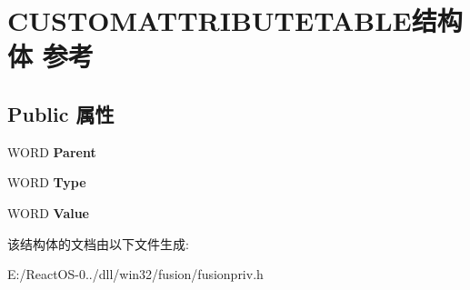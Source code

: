 \hypertarget{struct_c_u_s_t_o_m_a_t_t_r_i_b_u_t_e_t_a_b_l_e}{}\section{C\+U\+S\+T\+O\+M\+A\+T\+T\+R\+I\+B\+U\+T\+E\+T\+A\+B\+L\+E结构体 参考}
\label{struct_c_u_s_t_o_m_a_t_t_r_i_b_u_t_e_t_a_b_l_e}
\subsection*{Public 属性}
\begin{DoxyCompactItemize}
\item 
\mbox{\label{struct_c_u_s_t_o_m_a_t_t_r_i_b_u_t_e_t_a_b_l_e_ad33d6a59598271338d9f77d0bc6f70e0}} 
W\+O\+RD {\bfseries Parent}
\item 
\mbox{\label{struct_c_u_s_t_o_m_a_t_t_r_i_b_u_t_e_t_a_b_l_e_acc4bbc5985f8f77fc9f0fc32015c60ad}} 
W\+O\+RD {\bfseries Type}
\item 
\mbox{\label{struct_c_u_s_t_o_m_a_t_t_r_i_b_u_t_e_t_a_b_l_e_a8de923a6b6663082a81388e33b568647}} 
W\+O\+RD {\bfseries Value}
\end{DoxyCompactItemize}


该结构体的文档由以下文件生成\+:\begin{DoxyCompactItemize}
\item 
E\+:/\+React\+O\+S-\/0../dll/win32/fusion/fusionpriv.\+h\end{DoxyCompactItemize}

